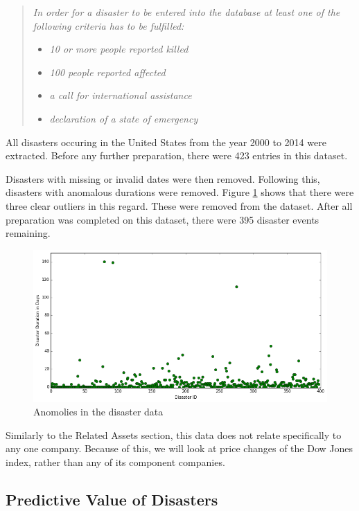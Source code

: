 \documentclass{report}
\begin{document}
\begin{quotation}
\textit{In order for a disaster to be entered into the database at least one of the following criteria has to be fulfilled:}
\begin{itemize}
  \item \textit{10 or more people reported killed}
  \item \textit{100 people reported affected}
  \item \textit{a call for international assistance}
  \item \textit{declaration of a state of emergency}
\end{itemize}
\end{quotation}

 All disasters occuring in the United States from the year 2000 to 2014 were extracted. Before any further preparation, there were 423 entries in this dataset.

Disasters with missing or invalid dates were then removed. Following this, disasters with anomalous durations were removed. Figure \ref{fig:disaster-data} shows that there were three clear outliers in this regard. These were removed from the dataset. After all preparation was completed on this dataset, there were 395 disaster events remaining.

\begin{figure}[H]
	\caption{Anomolies in the disaster data}
	\centerline{\includegraphics[width=\textwidth]{vis/disaster_data.png}}
	\label{fig:disaster-data}
\end{figure}

Similarly to the Related Assets section, this data does not relate specifically to any one company. Because of this, we will look at price changes of the Dow Jones index, rather than any of its component companies. 

\subsection{Predictive Value of Disasters}
\end{document}
